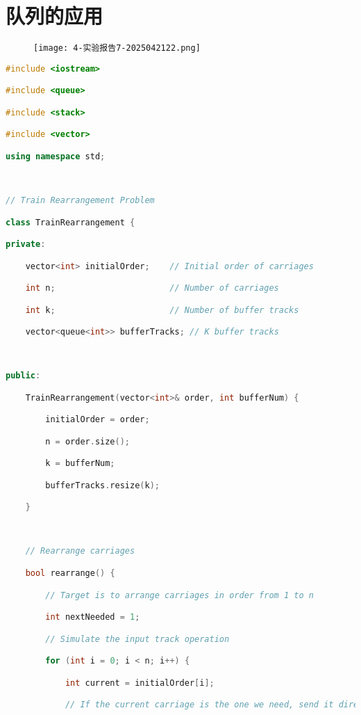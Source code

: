 \section{队列的应用}

\begin{figure}[H]
\centering
\texttt{[image: 4-实验报告7-2025042122.png]}
\label{}
\end{figure}

\begin{lstlisting}[language=C++]
#include <iostream>

#include <queue>

#include <stack>

#include <vector>

using namespace std;

  

// Train Rearrangement Problem

class TrainRearrangement {

private:

    vector<int> initialOrder;    // Initial order of carriages

    int n;                       // Number of carriages

    int k;                       // Number of buffer tracks

    vector<queue<int>> bufferTracks; // K buffer tracks

  

public:

    TrainRearrangement(vector<int>& order, int bufferNum) {

        initialOrder = order;

        n = order.size();

        k = bufferNum;

        bufferTracks.resize(k);

    }

  

    // Rearrange carriages

    bool rearrange() {

        // Target is to arrange carriages in order from 1 to n

        int nextNeeded = 1;

        // Simulate the input track operation

        for (int i = 0; i < n; i++) {

            int current = initialOrder[i];

            // If the current carriage is the one we need, send it directly to the output track


\end{lstlisting}
